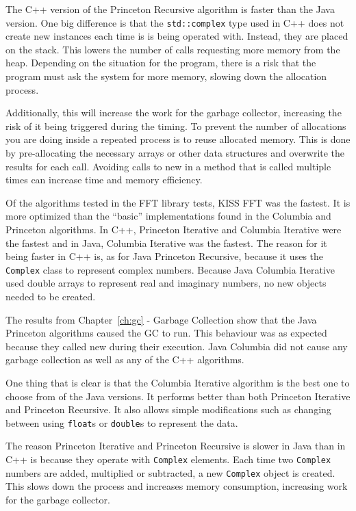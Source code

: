 The C++ version of the Princeton Recursive algorithm is faster than the Java version. One big difference is that the \texttt{std::complex} type used in C++ does not create new instances each time is is being operated with. Instead, they are placed on the stack. This lowers the number of calls requesting more memory from the heap. Depending on the situation for the program, there is a risk that the program must ask the system for more memory, slowing down the allocation process.

Additionally, this will increase the work for the garbage collector, increasing the risk of it being triggered during the timing. To prevent the number of allocations you are doing inside a repeated process is to reuse allocated memory. This is done by pre-allocating the necessary arrays or other data structures and overwrite the results for each call. Avoiding calls to new in a method that is called multiple times can increase time and memory efficiency.

Of the algorithms tested in the FFT library tests, KISS FFT was the fastest. It is more optimized than the \enquote{basic} implementations found in the Columbia and Princeton algorithms. In C++, Princeton Iterative and Columbia Iterative were the fastest and in Java, Columbia Iterative was the fastest. The reason for it being faster in C++ is, as for Java Princeton Recursive, because it uses the \texttt{Complex} class to represent complex numbers. Because Java Columbia Iterative used double arrays to represent real and imaginary numbers, no new objects needed to be created.

The results from Chapter~\ref{ch:gc} - Garbage Collection show that the Java Princeton algorithms caused the GC to run. This behaviour was as expected because they called new during their execution. Java Columbia did not cause any garbage collection as well as any of the C++ algorithms.

One thing that is clear is that the Columbia Iterative algorithm is the best one to choose from of the Java versions. It performs better than both Princeton Iterative and Princeton Recursive. It also allows simple modifications such as changing between using \texttt{float}s or  \texttt{double}s to represent the data.

The reason Princeton Iterative and Princeton Recursive is slower in Java than in C++ is because they operate with \texttt{Complex} elements. Each time two \texttt{Complex} numbers are added, multiplied or subtracted, a new \texttt{Complex} object is created. This slows down the process and increases memory consumption, increasing work for the garbage collector.

